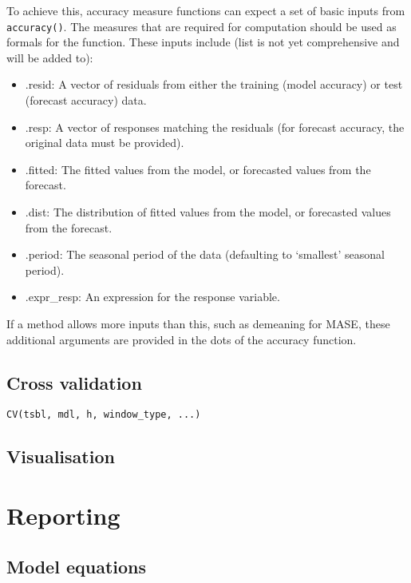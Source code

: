 \documentclass[]{book}
\providecommand{\tightlist}{%
  \setlength{\itemsep}{0pt}\setlength{\parskip}{0pt}}
\begin{document}
To achieve this, accuracy measure functions can expect a set of basic inputs from \texttt{accuracy()}. The measures that are required for computation should be used as formals for the function. These inputs include (list is not yet comprehensive and will be added to):

\begin{itemize}
\tightlist
\item
  .resid: A vector of residuals from either the training (model accuracy) or test (forecast accuracy) data.
\item
  .resp: A vector of responses matching the residuals (for forecast accuracy, the original data must be provided).
\item
  .fitted: The fitted values from the model, or forecasted values from the forecast.
\item
  .dist: The distribution of fitted values from the model, or forecasted values from the forecast.
\item
  .period: The seasonal period of the data (defaulting to `smallest' seasonal period).
\item
  .expr\_resp: An expression for the response variable.
\end{itemize}

If a method allows more inputs than this, such as demeaning for MASE, these additional arguments are provided in the dots of the accuracy function.

\hypertarget{cross-validation}{%
\section{Cross validation}\label{cross-validation}}

\texttt{CV(tsbl,\ mdl,\ h,\ window\_type,\ ...)}

\hypertarget{visualisation-2}{%
\section{Visualisation}\label{visualisation-2}}

\hypertarget{report}{%
\chapter{Reporting}\label{report}}

\hypertarget{model-equations}{%
\section{Model equations}\label{model-equations}}
\end{document}
